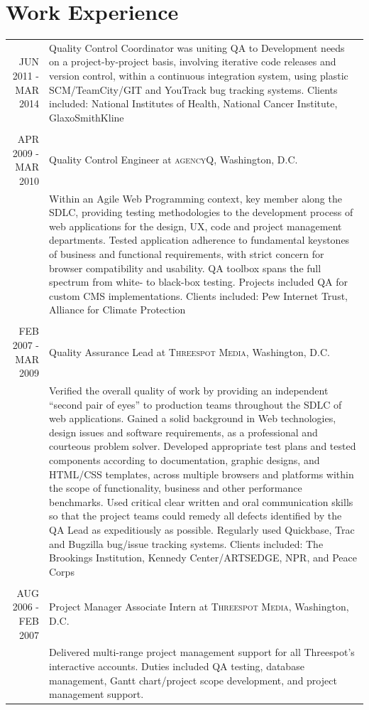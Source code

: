 \documentclass[a4paper,10pt]{article}
\begin{document}
\section{Work Experience}
\begin{tabular}{r|p{11cm}}
 \textsc{JUN 2011 - MAR 2014} & Quality Control Coordinator
was uniting QA to Development needs on a project-by-project basis, involving iterative code releases and version control, within a 
continuous integration system, using plastic SCM/TeamCity/GIT and YouTrack bug tracking systems.
Clients included: National Institutes of Health, National Cancer Institute, 
GlaxoSmithKline}\\\multicolumn{2}{c}{} \\
\textsc{APR 2009 - MAR 2010} & Quality Control Engineer
at \textsc{agencyQ}, Washington, D.C.\\&\footnotesize{Within an Agile Web Programming context, key member along the SDLC, providing testing methodologies to the development process of web applications for the design, UX, code and project management departments. Tested application adherence to fundamental keystones of business and functional requirements, with strict concern for browser compatibility and usability.  QA toolbox spans the full spectrum from white- to black-box testing. Projects included QA for custom CMS implementations.
Clients included: Pew Internet Trust, Alliance for Climate Protection}\\\multicolumn{2}{c}{} \\
\textsc{FEB 2007 - MAR 2009} & Quality Assurance Lead
at \textsc{Threespot Media}, Washington, D.C.\\&\footnotesize{Verified the overall quality of work by providing an independent “second pair of eyes” to production teams throughout the SDLC of web applications. Gained a solid background in Web technologies, design issues and software requirements, as a professional and courteous problem solver. Developed appropriate test plans and tested components according to documentation, graphic designs, and HTML/CSS templates, across multiple browsers and platforms within the scope of functionality, business and other performance benchmarks. Used critical clear written and oral communication skills so that the project teams could remedy all defects identified by the QA Lead as expeditiously as possible. Regularly used Quickbase, Trac and Bugzilla bug/issue tracking systems.
Clients included: The Brookings Institution, Kennedy Center/ARTSEDGE, NPR, and Peace Corps}\\\multicolumn{2}{c}{} \\
\textsc{AUG 2006 - FEB 2007} & Project Manager Associate Intern
at \textsc{Threespot Media}, Washington, D.C.\\&\footnotesize{Delivered multi-range project management support for all Threespot’s interactive accounts.  Duties included QA testing, database management, Gantt chart/project scope development, and project management support.}
\end{tabular}
\end{document}
